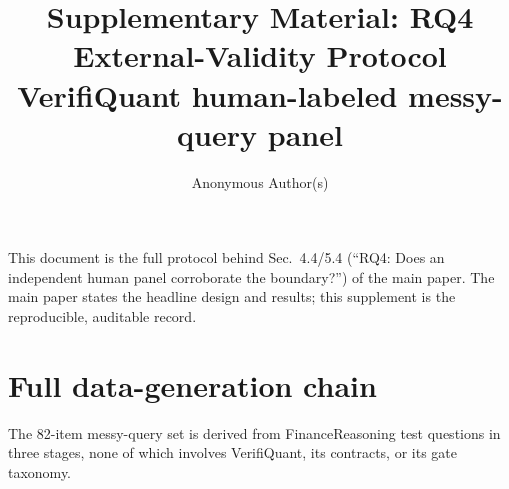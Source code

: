 \documentclass[11pt]{article}
\title{Supplementary Material: RQ4 External-Validity Protocol\\
\large VerifiQuant human-labeled messy-query panel}
\author{Anonymous Author(s)}
\date{}
\begin{document}
\maketitle
\noindent This document is the full protocol behind Sec.~4.4/5.4 (``RQ4: Does an independent
human panel corroborate the boundary?'') of the main paper. The main paper states the
headline design and results; this supplement is the reproducible, auditable record.

\section{Full data-generation chain}
The 82-item messy-query set is derived from FinanceReasoning test questions in three stages,
none of which involves VerifiQuant, its contracts, or its gate taxonomy.
\end{document}

